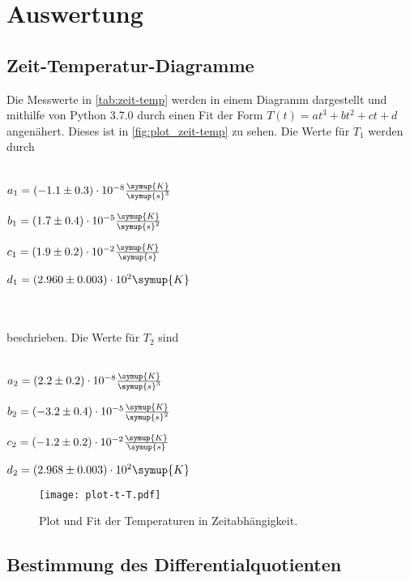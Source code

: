 \newpage
\section{Auswertung}
\label{sec:Auswertung}
\subsection{Zeit-Temperatur-Diagramme}



Die Messwerte in \autoref{tab:zeit-temp} werden in einem Diagramm dargestellt und mithilfe von Python 3.7.0 durch einen Fit der Form $T(t) = at^3 + bt^2 + ct + d$ angenähert.
Dieses ist in \autoref{fig:plot_zeit-temp} zu sehen. Die Werte für $T_1$ werden durch
\\ \\
\centerline{$a_1 = (-1.1 \pm 0.3 ) \cdot 10^\text{$-8$} \frac{\symup{K}}{\symup{s}^3}$}
\centerline{$b_1 = ( 1.7 \pm 0.4 ) \cdot 10^\text{$-5$} \frac{\symup{K}}{\symup{s}^2}$}
\centerline{$c_1 = ( 1.9 \pm 0.2 ) \cdot 10^\text{$-2$} \frac{\symup{K}}{\symup{s}}$}
\centerline{$d_1 = ( 2.960 \pm 0.003 ) \cdot 10^\text{$2$} \symup{K}$}
\\ \\
beschrieben. Die Werte für $T_2$ sind
\\ \\
\centerline{$a_2 = ( 2.2 \pm 0.2 ) \cdot 10^\text{$-8$} \frac{\symup{K}}{\symup{s}^3}$}
\centerline{$b_2 = (-3.2 \pm 0.4 ) \cdot 10^\text{$-5$} \frac{\symup{K}}{\symup{s}^2}$}
\centerline{$c_2 = (-1.2 \pm 0.2 ) \cdot 10^\text{$-2$} \frac{\symup{K}}{\symup{s}}$}
\centerline{$d_2 = ( 2.968 \pm 0.003 ) \cdot 10^\text{$2$} \symup{K}$}

\begin{figure}
  \centering
  \texttt{[image: plot-t-T.pdf]}
  \caption{Plot und Fit der Temperaturen in Zeitabhängigkeit.}
  \label{fig:plot_zeit-temp}
\end{figure}


\subsection{Bestimmung des Differentialquotienten}

